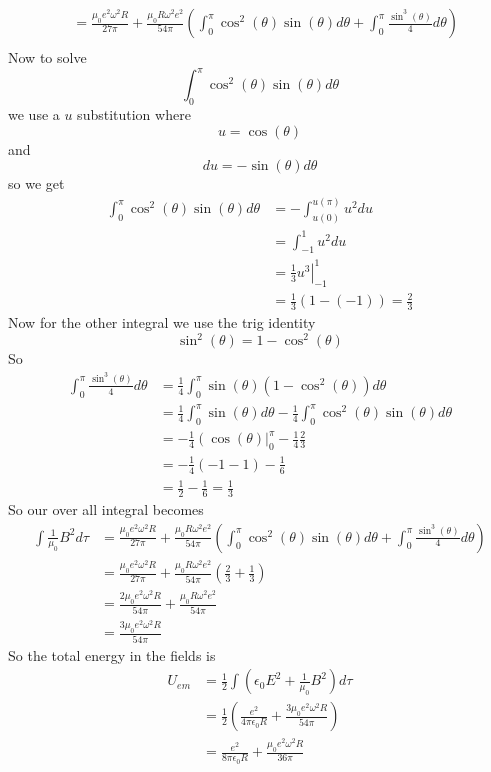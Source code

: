 \documentclass[11pt]{article}
\numberwithin{equation}{section}
\begin{document}
\begin{enumerate}[(a)]
\begin{align*}
&= \frac{\mu_0e^2\omega^2R}{27\pi} + \frac{\mu_0R\omega^2e^2}{54\pi}\left(\int_0^{\pi}\cos^2(\theta)\sin(\theta)d\theta +\int_0^{\pi}\frac{\sin^3(\theta)}{4}d\theta\right)\\
\end{align*}
Now to solve 
$$\int_0^{\pi}\cos^2(\theta)\sin(\theta)d\theta$$
we use a $u$ substitution where 
$$u = \cos(\theta)$$
and
$$du = -\sin(\theta)d\theta$$
so we get
\begin{align*}
\int_0^{\pi}\cos^2(\theta)\sin(\theta)d\theta &= -\int_{u(0)}^{u(\pi)}u^2du\\
&= \int_{-1}^{1}u^2du\\
&= \left.\frac{1}{3}u^3\right|_{-1}^{1}\\
&= \frac{1}{3}\left(1-(-1)\right) = \frac{2}{3}
\end{align*}
Now for the other integral we use the trig identity 
$$\sin^2(\theta) = 1- \cos^2(\theta)$$
So 
\begin{align*}
\int_0^{\pi}\frac{\sin^3(\theta)}{4}d\theta &= \frac{1}{4}\int_0^{\pi}\sin(\theta)(1-\cos^2(\theta))d\theta\\
&= \frac{1}{4}\int_0^{\pi}\sin(\theta)d\theta-\frac{1}{4}\int_0^{\pi}\cos^2(\theta)\sin(\theta)d\theta\\
&= -\frac{1}{4}\left(\cos(\theta)\right|_0^{\pi}-\frac{1}{4}\frac{2}{3}\\
&= -\frac{1}{4}\left(-1-1\right)-\frac{1}{6}\\
&= \frac{1}{2}-\frac{1}{6} = \frac{1}{3}
\end{align*}
So our over all integral becomes
\begin{align*}
\int\frac{1}{\mu_0}B^2d\tau &= \frac{\mu_0e^2\omega^2R}{27\pi} + \frac{\mu_0R\omega^2e^2}{54\pi}\left(\int_0^{\pi}\cos^2(\theta)\sin(\theta)d\theta +\int_0^{\pi}\frac{\sin^3(\theta)}{4}d\theta\right)\\
&= \frac{\mu_0e^2\omega^2R}{27\pi} + \frac{\mu_0R\omega^2e^2}{54\pi}\left(\frac{2}{3}+\frac{1}{3}\right)\\
&= \frac{2\mu_0e^2\omega^2R}{54\pi} + \frac{\mu_0R\omega^2e^2}{54\pi}\\
&= \frac{3\mu_0e^2\omega^2R}{54\pi} 
\end{align*}
So the total energy in the fields is 
\begin{align*}
U_{em} &= \frac{1}{2}\int\left(\epsilon_0E^2+\frac{1}{\mu_0}B^2\right)d\tau\\
&= \frac{1}{2}\left(\frac{e^2}{4\pi\epsilon_0R}+\frac{3\mu_0e^2\omega^2R}{54\pi}\right)\\
&= \frac{e^2}{8\pi\epsilon_0R}+\frac{\mu_0e^2\omega^2R}{36\pi}
\end{align*}


\end{enumerate}
\end{document}
